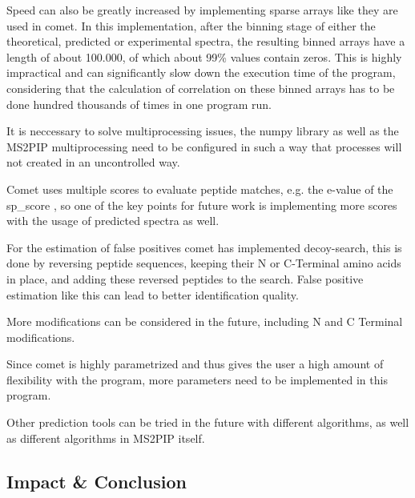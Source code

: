 \documentclass[11pt]{article}
\begin{document}
Speed can also be greatly increased by implementing sparse arrays like they are used in comet. In this implementation, after the binning stage of either the theoretical, predicted or experimental spectra, the resulting binned arrays have a length of about 100.000, of which about 99\% values contain zeros. This is highly impractical and can significantly slow down the execution time of the program, considering that the calculation of correlation on these binned arrays has to be done hundred thousands of times in one program run.

It is neccessary to solve multiprocessing issues, the numpy library as well as the MS2PIP multiprocessing need to be configured in such a way that processes will not created in an uncontrolled way. 

Comet uses multiple scores to evaluate peptide matches, e.g. the e-value of the sp\_score , so one of the key points for future work is implementing more scores with the usage of predicted spectra as well.

For the estimation of false positives comet has implemented decoy-search, this is done by reversing peptide sequences, keeping their N or C-Terminal amino acids in place, and adding these reversed peptides to the search. False positive estimation like this can lead to better identification quality.

More modifications can be considered in the future, including N and C Terminal modifications.

Since comet is highly parametrized and thus gives the user a high amount of flexibility with the program, more parameters need to be implemented in this program.

Other prediction tools can be tried in the future with different algorithms, as well as different algorithms in MS2PIP itself.

\subsection{Impact \& Conclusion}


\printbibliography
\end{document}
